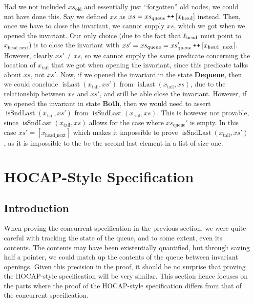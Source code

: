 \documentclass[a4paper, 10pt]{report}
\theoremstyle{definition}
\newcommand{\xsc}{xs}
\newcommand{\xsqueue}{xs_{\mathrm{queue}}}
\newcommand{\xsold}{xs_{\mathrm{old}}}
\newcommand{\isLast}{\operatorname{isLast}}
\newcommand{\isSndLast}{\operatorname{isSndLast}}
\newcommand{\locN}[1]{\loc_{\mathrm{#1}}}
\newcommand{\lochead}{\locN{head}}
\newcommand{\node}{x}
\newcommand{\nodeN}[1]{\node_{\mathrm{#1}}}
\newcommand{\nodehead}{\nodeN{head}}
\newcommand{\nodetail}{\nodeN{tail}}
\newcommand{\nodeheadnext}{\nodeN{head\_next}}
\newcommand{\DequeueState}{\textbf{Dequeue}\xspace}
\newcommand{\BothState}{\textbf{Both}\xspace}
\newcommand\catenate{\mathbin{\text{\ttfamily\upshape ++}}}
\begin{document}
Had we not included $\xsold$ and essentially just ``forgotten'' old nodes, we could not have done this. Say we defined $\xsc$ as $\xsc = \xsqueue \catenate [\nodehead]$ instead. Then, once we have to close the invariant, we cannot supply $\xsc$, which we got when we opened the invariant. Our only choice (due to the fact that $\lochead$ must point to $\nodeheadnext$) is to close the invariant with $\xsc' = \xsqueue = \xsqueue' \catenate [\nodeheadnext]$. However, clearly $\xsc' \neq \xsc$, so we cannot supply the same predicate concerning the location of $\nodetail$ that we got when opening the invariant, since this predicate talks about $\xsc$, not $\xsc'$. Now, if we opened the invariant in the state \DequeueState, then we could conclude $\isLast(\nodetail, \xsc')$ from $\isLast(\nodetail, \xsc)$, due to the relationship between $\xsc$ and $\xsc'$, and still be able close the invariant. However, if we opened the invariant in state \BothState, then we would need to assert $\isSndLast(\nodetail, \xsc')$ from $\isSndLast(\nodetail, \xsc)$. This is however not provable, since $\isSndLast(\nodetail, \xsc)$ allows for the case where $\xsqueue'$ is empty. In this case $\xsc' = [\nodeheadnext]$ which makes it impossible to prove $\isSndLast(\nodetail, \xsc')$, as it is impossible to the be the second last element in a list of size one.

\section{HOCAP-Style Specification}
\label{TLMSQSPECS:section:hocap}

\subsection{Introduction}
When proving the concurrent specification in the previous section, we were quite careful with tracking the state of the queue, and to some extent, even its contents. The contents may have been existentially quantified, but through saving half a pointer, we could match up the contents of the queue between invariant openings. Given this precision in the proof, it should be no surprise that proving the HOCAP-style specification will be very similar. This section hence focuses on the parts where the proof of the HOCAP-style specification differs from that of the concurrent specification.
\end{document}

